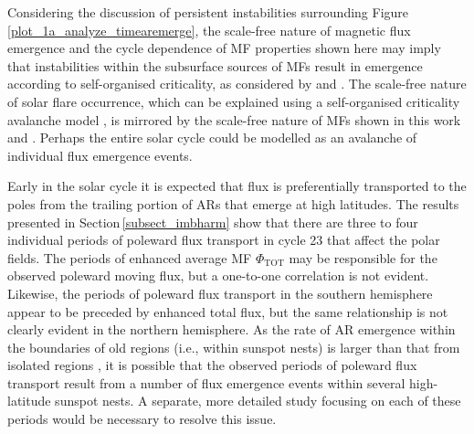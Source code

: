 \documentclass[namedreferences]{solarphysics}
\begin{document}
\begin{article}
Considering the discussion of persistent instabilities surrounding Figure\,\ref{plot_1a_analyze_timearemerge}, the scale-free nature of magnetic flux emergence and the cycle dependence of MF properties shown here may imply that instabilities within the subsurface sources of MFs result in emergence according to self-organised criticality, as considered by \citet{Aschwanden:2011} and \citet{Abramenko:2013}. The scale-free nature of solar flare occurrence, which can be explained using a self-organised criticality avalanche model \citep[see, e.g.,][]{Lu:1991}, is mirrored by the scale-free nature of MFs shown in this work and \citet{Parnell:2009}. Perhaps the entire solar cycle could be modelled as an avalanche of individual flux emergence events. %


Early in the solar cycle it is expected that flux is preferentially transported to the poles from the trailing portion of ARs that emerge at high latitudes. The results presented in Section\,\ref{subsect_imbharm} show that there are three to four individual periods of poleward flux transport in cycle 23 that affect the polar fields. The periods of enhanced average MF $\Phi_\mathrm{TOT}$ may be responsible for the observed poleward moving flux, but a one-to-one correlation is not evident. Likewise, the periods of poleward flux transport in the southern hemisphere appear to be preceded by enhanced total flux, but the same relationship is not clearly evident in the northern hemisphere. As the rate of AR emergence within the boundaries of old regions (i.e., within sunspot nests) is larger than that from isolated regions \citep{harvey:1993}, it is possible that the observed periods of poleward flux transport result from a number of flux emergence events within several high-latitude sunspot nests. A separate, more detailed study focusing on each of these periods would be necessary to resolve this issue.


\end{article}
\end{document}
